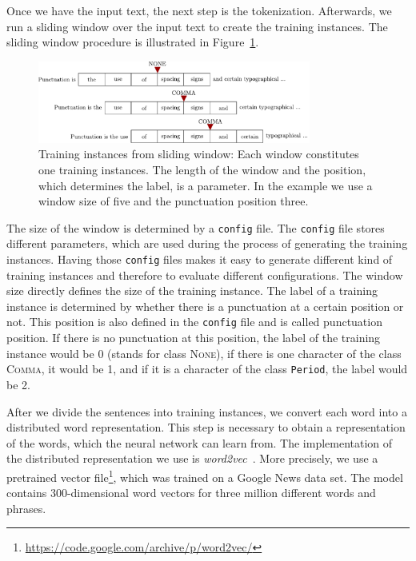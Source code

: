 Once we have the input text, the next step is the tokenization.
Afterwards, we run a sliding window over the input text to create the training instances.
The sliding window procedure is illustrated in Figure~\ref{fig:sliding_window}.
\begin{figure}[ht]
    \centering
    \includegraphics[width=0.8\textwidth]{img/sliding_window.pdf}
    \caption{Training instances from sliding window: Each window constitutes one training instances. The length of the window and the position, which determines the label, is a parameter. In the example we use a window size of five and the punctuation position three.}
    \label{fig:sliding_window}
\end{figure}
The size of the window is determined by a \texttt{config} file.
The \texttt{config} file stores different parameters, which are used during the process of generating the training instances.
Having those \texttt{config} files makes it easy to generate different kind of training instances and therefore to evaluate different configurations.
The window size directly defines the size of the training instance.
The label of a training instance is determined by whether there is a punctuation at a certain position or not.
This position is also defined in the \texttt{config} file and is called punctuation position.
If there is no punctuation at this position, the label of the training instance would be 0 (stands for class \textsc{None}), if there is one character of the class \textsc{Comma}, it would be 1, and if it is a character of the class \texttt{Period}, the label would be 2.

After we divide the sentences into training instances, we convert each word into a distributed word representation.
This step is necessary to obtain a representation of the words, which the neural network can learn from.
The implementation of the distributed representation we use is \emph{word2vec}~\cite{Mikolov1, Mikolov2, Mikolov3}.
More precisely, we use a pretrained vector file\footnote{\url{https://code.google.com/archive/p/word2vec/}}, which was trained on a Google News data set.
The model contains 300-dimensional word vectors for three million different words and phrases.

